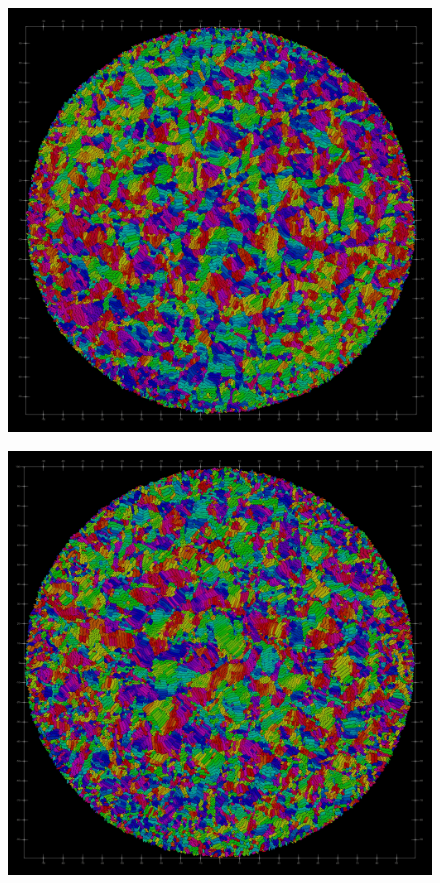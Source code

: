 \documentclass[conference]{IEEEtran}
\begin{document}
\begin{figure}[h]
    \centering
    \includegraphics[width=\linewidth]{figures/orientation_comparisons/hard_e-2_orient.jpeg}
    \caption{ }
\end{figure}
\begin{figure}[h]
    \centering
    \includegraphics[width=\linewidth]{figures/orientation_comparisons/hard_e-3_orient.jpeg}
    \caption{ }
\end{figure}
\end{document}
